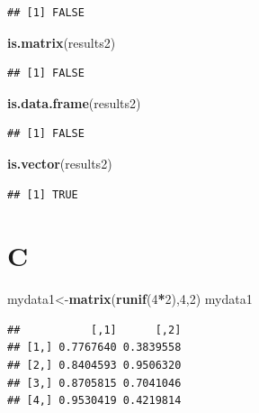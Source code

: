 \documentclass[]{book}
\newenvironment{Shaded}{\begin{snugshade}}{\end{snugshade}}
\newcommand{\DecValTok}[1]{\textcolor[rgb]{0.00,0.00,0.81}{#1}}
\newcommand{\KeywordTok}[1]{\textcolor[rgb]{0.13,0.29,0.53}{\textbf{#1}}}
\newcommand{\NormalTok}[1]{#1}
\newcommand{\OperatorTok}[1]{\textcolor[rgb]{0.81,0.36,0.00}{\textbf{#1}}}
\begin{document}
\begin{verbatim}
## [1] FALSE
\end{verbatim}

\begin{Shaded}
\begin{Highlighting}[]
\KeywordTok{is.matrix}\NormalTok{(results2)}
\end{Highlighting}
\end{Shaded}

\begin{verbatim}
## [1] FALSE
\end{verbatim}

\begin{Shaded}
\begin{Highlighting}[]
\KeywordTok{is.data.frame}\NormalTok{(results2)}
\end{Highlighting}
\end{Shaded}

\begin{verbatim}
## [1] FALSE
\end{verbatim}

\begin{Shaded}
\begin{Highlighting}[]
\KeywordTok{is.vector}\NormalTok{(results2)}
\end{Highlighting}
\end{Shaded}

\begin{verbatim}
## [1] TRUE
\end{verbatim}

\hypertarget{c}{%
\section{C}\label{c}}

\begin{Shaded}
\begin{Highlighting}[]
\NormalTok{mydata1<-}\KeywordTok{matrix}\NormalTok{(}\KeywordTok{runif}\NormalTok{(}\DecValTok{4}\OperatorTok{*}\DecValTok{2}\NormalTok{),}\DecValTok{4}\NormalTok{,}\DecValTok{2}\NormalTok{)}
\NormalTok{mydata1}
\end{Highlighting}
\end{Shaded}

\begin{verbatim}
##           [,1]      [,2]
## [1,] 0.7767640 0.3839558
## [2,] 0.8404593 0.9506320
## [3,] 0.8705815 0.7041046
## [4,] 0.9530419 0.4219814
\end{verbatim}
\end{document}
